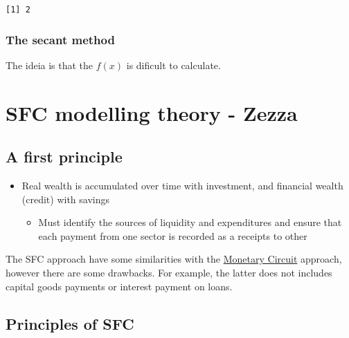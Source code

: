 \documentclass[11pt]{article}
\begin{document}
\begin{verbatim}
[1] 2
\end{verbatim}

\subsubsection*{The secant method}
\label{sec:org872615e}

The ideia is that the \(f(x)\) is dificult to calculate.

\section*{SFC modelling theory - Zezza}
\label{sec:org1a7a1dc}

\subsection*{A first principle}
\label{sec:org466d982}

\begin{itemize}
\item Real wealth is accumulated over time with investment, and financial wealth (credit) with savings
\begin{itemize}
\item Must identify the sources of liquidity and expenditures and ensure that each payment from one sector is recorded as a receipts to other
\end{itemize}
\end{itemize}

The SFC approach have some similarities with the \href{monetary_circuit.org}{Monetary Circuit} approach, however there are some drawbacks.
For example, the latter does not includes capital goods payments or interest payment on loans.

\subsection*{Principles of SFC}
\label{sec:org08ea341}
\end{document}
